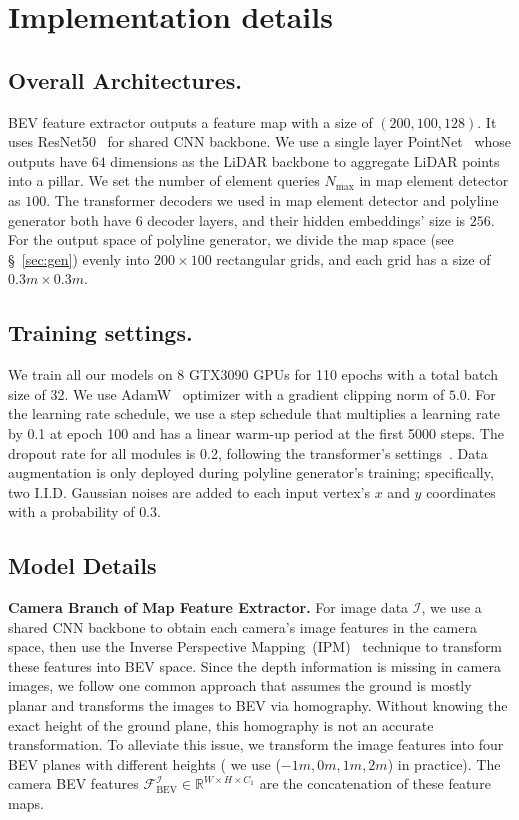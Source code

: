 \documentclass{article}
\theoremstyle{plain}
\theoremstyle{definition}
\theoremstyle{remark}
\begin{document}
\section{Implementation details}
\label{sec:implementation}
\subsection{Overall Architectures.} BEV feature extractor outputs a feature map with a size of $(200,100,128)$. It uses ResNet50~\citep{he2016deep} for shared CNN backbone. We use a single layer PointNet~\citep{qi2017pointnet} whose outputs have $64$ dimensions as the LiDAR backbone to aggregate LiDAR points into a pillar. 
We set the number of element queries $N_{\mathrm{max}}$ in map element detector as $100$. 
The transformer decoders we used in map element detector and polyline generator both have $6$ decoder layers, and their hidden embeddings' size is $256$. 
For the output space of polyline generator, we divide the map space (see \S~\ref{sec:gen}) evenly into $200\times100$ rectangular grids, and each grid has a size of $0.3m\times0.3m$.

\subsection{Training settings.}
We train all our models on 8 GTX3090 GPUs for 110 epochs with a total batch size of 32.
We use AdamW~\citep{loshchilov2018fixing} optimizer with a gradient clipping norm of $5.0$. For the learning rate schedule, we use a step schedule that multiplies a learning rate by 0.1 at epoch 100 and has a linear warm-up period at the first 5000 steps. The dropout rate for all modules is 0.2, following the transformer's settings~\citep{vaswani2017attention}. 
Data augmentation is only deployed during polyline generator's training; specifically, two I.I.D. Gaussian noises are added to each input vertex's $x$ and $y$ coordinates with a probability of $0.3$.

\subsection{Model Details}
\label{model_details}
\noindent\textbf{Camera Branch of Map Feature Extractor.}
For image data $\mathcal{I}$, we use a shared CNN backbone to obtain each camera's image features in the camera space, then use the Inverse Perspective Mapping~(IPM)~\citep{mallot1991inverse} technique to transform these features into BEV space. Since the depth information is missing in camera images, we follow one common approach that assumes the ground is mostly planar and transforms the images to BEV via homography. 
Without knowing the exact height of the ground plane, this homography is not an accurate transformation. 
To alleviate this issue, we transform the image features into four BEV planes with different heights ( we use ($-1m,0m,1m,2m$) in practice). The camera BEV features $\bm{\mathcal{F}}_{\mathrm{BEV}}^\mathcal{I}\in\mathbb{R}^{W \times H \times C_1}$ are the concatenation of these feature maps.
\end{document}
